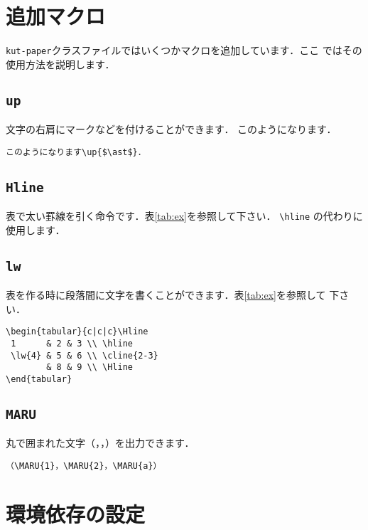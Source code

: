 \documentclass[mingoth]{kut-paper}		%
\begin{document}

\chapter{追加マクロ}
\texttt{kut-paper}クラスファイルではいくつかマクロを追加しています．ここ
ではその使用方法を説明します．

 \section{\texttt{up}}
 文字の右肩にマークなどを付けることができます．
 このようになります\up{$\ast$}．
\begin{verbatim}
このようになります\up{$\ast$}．
\end{verbatim}

 \section{\texttt{Hline}}
 表で太い罫線を引く命令です．表\ref{tab:ex}を参照して下さい．
 \verb|\hline| の代わりに使用します．
 
 \section{\texttt{lw}}
 表を作る時に段落間に文字を書くことができます．表\ref{tab:ex}を参照して
 下さい．
\begin{verbatim}
\begin{tabular}{c|c|c}\Hline
 1      & 2 & 3 \\ \hline
 \lw{4} & 5 & 6 \\ \cline{2-3}
        & 8 & 9 \\ \Hline
\end{tabular}
\end{verbatim}

 \section{\texttt{MARU}}
 丸で囲まれた文字（，，）を出力できます．
\begin{verbatim}
（\MARU{1}，\MARU{2}，\MARU{a}）
\end{verbatim}
 

\chapter{環境依存の設定}
\end{document}
